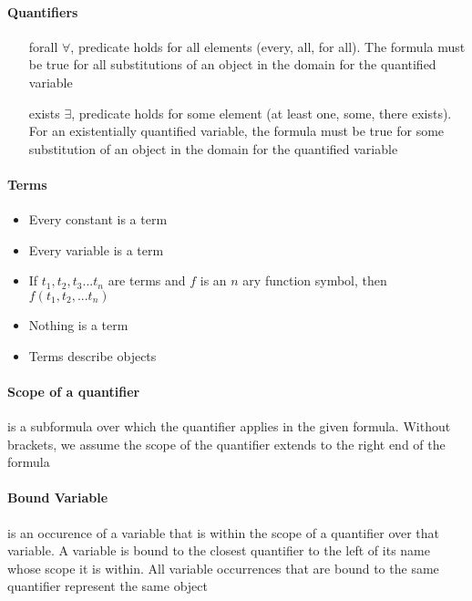 \documentclass[12pt]{report}
\begin{document}
    \paragraph{Quantifiers}
      \begin{itemize}
        \item[forall] $ \forall $, predicate holds for all elements (every,
        all, for all). The formula must be true for all substitutions of an
        object in the domain for the quantified variable
        \item[exists] $ \exists $, predicate holds for some element (at least
        one, some, there exists). For an existentially quantified variable,
        the formula must be true for some substitution of an object in the
        domain for the quantified variable
      \end{itemize}

    \paragraph{Terms}
      \begin{itemize}
        \item Every constant is a term
        \item Every variable is a term
        \item If $t_1, t_2, t_3 ... t_n$ are terms and $f$ is an $n$ ary
        function symbol, then $f(t_1, t_2, ... t_n)$
        \item Nothing is a term
        \item Terms describe objects
      \end{itemize}

    \paragraph{Scope of a quantifier} is a subformula over which the quantifier
    applies in the given formula. Without brackets, we assume the scope of the
    quantifier extends to the right end of the formula

    \paragraph{Bound Variable} is an occurence of a variable that is within the
    scope of a quantifier over that variable. A variable is bound to the
    closest quantifier to the left of its name whose scope it is within. All
    variable occurrences that are bound to the same quantifier represent the
    same object
\end{document}
